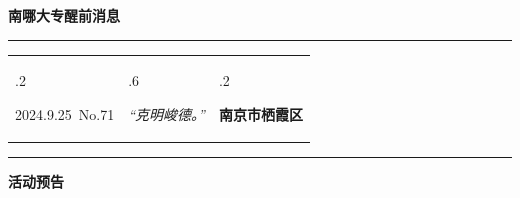 \documentclass[letterpaper, 12pt]{article}
\begin{document}
\begin{center}
    \Huge\textbf{南哪大专醒前消息}
\end{center}
\vspace{4mm}
\hrule
\renewcommand\tabularxcolumn[1]{m{#1}}
\begin{tabularx}{\textwidth}{>{\hsize.2\hsize}X>{\hsize.6\hsize}X>{\hsize.2\hsize}X}
    \begin{flushleft}
        2024.9.25\, No.71
    \end{flushleft}
    &
    \begin{center}
        \textit{“克明峻德。”}
    \end{center}
    &
    \begin{flushright}
        \textbf{南京市栖霞区}
    \end{flushright}
\end{tabularx}
\vspace{-3.5mm}
\hrule
\vspace{4mm}
\centerline{\huge\textbf{活动预告}}
\end{document}

